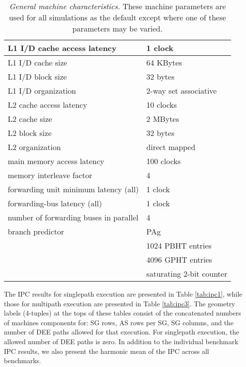 \documentclass[10pt,twocolumn,dvips]{article}
\begin{document}
\begin{table*}
\scriptsize{
\begin{center}
\caption{{\em General machine characteristics.}
These machine parameters are used for all simulations as
the default except where one of these parameters may be varied.}
\label{tab:params}
\begin{tabular}{|l|l|}
\hline 
L1 I/D cache access latency&1 clock\\
\hline
L1 I/D cache size&64 KBytes\\
\hline
L1 I/D block size&32 bytes\\
\hline
L1 I/D organization&2-way set associative\\
\hline
L2 cache access latency&10 clocks\\
\hline
L2 cache size&2 MBytes\\
\hline
L2 block size&32 bytes\\
\hline
L2 organization&direct mapped\\
\hline
main memory access latency&100 clocks\\
\hline
memory interleave factor&4\\
\hline
forwarding unit minimum latency (all)&1 clock\\
\hline
forwarding-bus latency (all)&1 clock\\
\hline
number of forwarding buses in parallel&4\\
\hline
branch predictor&PAg\\
\cline{2-2}
 & 1024 PBHT entries\\
\cline{2-2}
 & 4096 GPHT entries\\
\cline{2-2}
 & saturating 2-bit counter\\
\hline
\end{tabular}
\end{center}
}
\end{table*}
%
The IPC results for singlepath execution are presented in
Table \ref{tab:ipc1}, while those for multipath execution are
presented in Table \ref{tab:ipc3}.
The geometry labels (4-tuples) 
at the tops of these tables consist of the concatenated 
numbers of
machines components for: SG rows, AS rows per SG, SG columns,
and the number of DEE paths allowed for that execution.
For singlepath execution, the allowed number of 
DEE paths is zero.
In addition to the individual benchmark IPC results, we also
present the harmonic mean of the IPC across all benchmarks.
%
\end{document}
